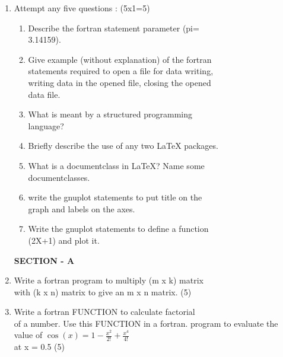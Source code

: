 \documentclass{book}
\begin{document}
\begin{enumerate}
\setlength\itemsep{1em}

\item  Attempt any five questions : \hfill (5x1=5)

\begin{enumerate}[label=(\alph*)]
\setlength\itemsep{0.75em}

\item Describe the fortran statement parameter (pi=\\ 3.14159).

\item  Give example (without explanation) of the fortran\\
statements required to open a file for data writing, \\
writing data in the opened file, closing the opened \\
data file.

\item What is meant by a structured programming \\ language?

\item Briefly describe the use of any two LaTeX packages.

\item What is a documentclass in LaTeX? Name some \\ documentclasses.

\item write the gnuplot statements to put title on the \\ graph and labels on the axes.

\item Write the gnuplot statements to define a function \\ (2X+1) and plot it.

\end{enumerate}

\vspace{1em}
\begin{center} \textbf{SECTION - A} \end{center}


\item  Write a fortran program to multiply (m x k) matrix \\
with (k x n) matrix to give an m x n matrix. \hfill (5)

\item Write a fortran FUNCTION to calculate factorial \\
of a number. Use this FUNCTION in a fortran. program to evaluate the value of
$\cos(x) = 1 -\frac{x^2}{2!} + \frac{x^4}{4!}$
\\ at x = 0.5 \hfill (5)


\end{enumerate}
\end{document}
